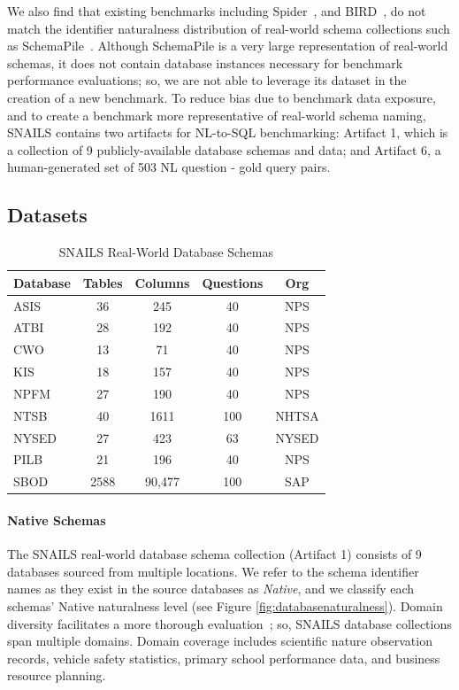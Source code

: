 We also find that existing benchmarks including Spider~\cite{Yu&al.18c}, and BIRD~\cite{li2023llm}, do not match the identifier naturalness distribution of real-world schema collections such as SchemaPile~\cite{doehmen2024schemapile}.
Although SchemaPile is a very large representation of real-world schemas, it does not contain database instances necessary for benchmark performance evaluations; so, we are not able to leverage its dataset in the creation of a new benchmark.
To reduce bias due to benchmark data exposure, and to create a benchmark more representative of real-world schema naming, SNAILS contains two artifacts for NL-to-SQL benchmarking: Artifact 1, which is a collection of 9 publicly-available database schemas and data; and Artifact 6, a human-generated set of 503 NL question - gold query pairs.

\subsection{Datasets}
\label{subsection:benchmark-datasets}

\begin{table}[t]
  \centering
  \caption{SNAILS Real-World Database Schemas}
  \begin{tabular}{p{2cm}cccc}
  \toprule
  \textbf{Database} & \textbf{Tables} & \textbf{Columns} & \textbf{Questions} & \textbf{Org} \\
  \midrule
  ASIS & 36 & 245 & 40 & NPS \\
  ATBI & 28 & 192 & 40 & NPS \\
  CWO & 13 & 71 & 40 & NPS \\
  KIS & 18 & 157 & 40 & NPS \\
  NPFM & 27 & 190 & 40 & NPS \\
  NTSB & 40 & 1611 & 100 & NHTSA \\
  NYSED & 27 & 423 & 63 & NYSED \\
  PILB & 21 & 196 & 40 & NPS \\
  SBOD & 2588 & 90,477 & 100 & SAP \\
  \bottomrule
  \end{tabular}
  \label{table:benchmarkschemas}
\end{table}

\paragraph{\textbf{Native Schemas}}
The SNAILS real-world database schema collection (Artifact 1) consists of 9 databases sourced from multiple locations.
We refer to the schema identifier names as they exist in the source databases as \emph{Native}, and we classify each schemas' Native naturalness level (see Figure \ref{fig:databasenaturalness}).
Domain diversity facilitates a more thorough evaluation~\cite{finegan-dollak-etal-2018-improving}; so, SNAILS database collections span multiple domains.
Domain coverage includes scientific nature observation records, vehicle safety statistics, primary school performance data, and business resource planning.

